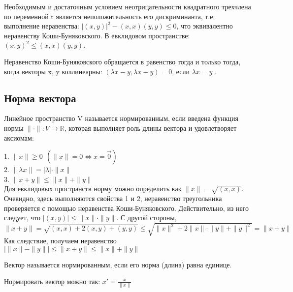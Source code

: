 Необходимым и достаточным условием неотрицательности квадратного трехчлена по 
переменной t является
неположительность его дискриминанта, т.е. выполнение неравенства:
$|(x,y)|^2-(x,x)(y,y)\leqslant0$,
что эквивалентно неравенству Коши-Буняковского.
В евклидовом пространстве: $(x,y)^2\leqslant(x,x)(y,y)$.

Неравенство Коши-Буняковского обращается в равенство тогда и только тогда, 
когда векторы x, y коллинеарны:
$(\lambda x-y,\lambda x-y)=0$, если $\lambda x=y$ .

\subsection{Норма вектора}
\begin{defin}
Линейное пространство V называется нормированным, если введена функция нормы
$\|\cdot\|\colon V\to\mathbb R$, которая выполняет роль длины вектора и 
удовлетворяет аксиомам:
\end{defin}
1. $\|x\|\geqslant0~~(\|x\|=0\Leftrightarrow x=\Vec{0})$\\
2. $\|\lambda x\|=|\lambda|\cdot\|x\|$\\
3. $\|x+y\|\leqslant\|x\|+\|y\|$\\
Для евклидовых пространств норму можно определить как $\|x\|=\sqrt{(x,x)}$.
Очевидно, здесь выполняются свойства 1 и 2, неравенство треугольника 
проверяется с помощью неравенства Коши-Буняковского. Действительно, из него
следует, что $|(x,y)|\leqslant\|x\|\cdot\|y\|$. С другой стороны, 
$\|x+y\|=\sqrt{(x,x)+2(x,y)+(y,y)}\leqslant\sqrt{\|x\|^2+2\|x\|\cdot\|y\|+
\|y\|^2}=\|x+y\|$ Как следствие, получаем неравенство $|\|x\|-\|y\||\leqslant
\|x+y\|\leqslant\|x\|+\|y\|$
\begin{defin}
Вектор называется нормированным, если его норма (длина) равна единице.
\end{defin}
Нормировать вектор можно так: $x'=\frac{x}{\|x\|}$

